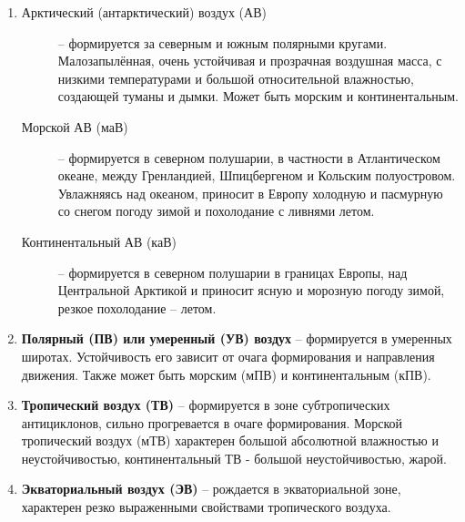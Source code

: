 \begin{enumerate}
\item \begin{description}
  \item[Арктический (антарктический) воздух (АВ)]
    \--- формируется за северным и южным полярными
    кругами. Малозапылённая, очень устойчивая и прозрачная воздушная
    масса, с низкими температурами и большой относительной влажностью,
    создающей туманы и дымки. Может быть морским и континентальным.
  \item[Морской АВ (маВ)]
    \--- формируется в северном полушарии, в
    частности в Атлантическом океане, между Гренландией, Шпицбергеном
    и Кольским полуостровом. Увлажняясь над океаном, приносит в Европу
    холодную и пасмурную со снегом погоду зимой и похолодание с
    ливнями летом.
  \item[Континентальный АВ (каВ)]
    \--- формируется в северном
    полушарии в границах Европы, над Центральной Арктикой и приносит
    ясную и морозную погоду зимой, резкое похолодание \--- летом.
  \end{description}
\item \textbf{Полярный (ПВ) или умеренный (УВ) воздух}
  \---
  формируется в умеренных широтах. Устойчивость его зависит от очага
  формирования и направления движения. Также может быть морским (мПВ)
  и континентальным (кПВ).
\item \textbf{Тропический воздух (ТВ)}
  \--- формируется в зоне
  субтропических антициклонов, сильно прогревается в очаге
  формирования. Морской тропический воздух (мТВ) характерен большой
  абсолютной влажностью и неустойчивостью, континентальный ТВ -
  большой неустойчивостью, жарой.
\item \textbf{Экваториальный воздух (ЭВ)}
  \--- рождается в
  экваториальной зоне, характерен резко выраженными свойствами
  тропического воздуха.
\end{enumerate}

